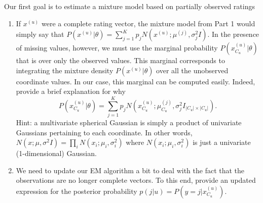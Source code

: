 \begin{enumerate}
Our first goal is to estimate a mixture model based on partially observed ratings 
\begin{enumerate}
\item If $x^{(u)}$ were a complete rating vector, the mixture model from Part 1 would simply say that $P(x^{(u)} | \theta) = \sum^{K}_{j=1} p_j N(x^{(u)}; \mu^{(j)}, \sigma^2_j I)$. In the presence of missing values, however, we must use the marginal probability $P(x^{(u)}_{C_u} | \theta)$ that is over only the observed values. This marginal corresponds to integrating the mixture density $P(x^{(u)} | \theta)$ over all the unobserved coordinate values. In our case, this marginal can be computed easily. Indeed, provide a brief explanation for why 
$$P(x^{(u)}_{C_u}  | \theta) = \sum^{K}_{j=1} p_j N(x^{(u)}_{C_u} ; \mu^{(j)}_{C_u} , \sigma^2_j I_{|C_u| \times |C_u|}).$$
Hint: a multivariate spherical Gaussian is simply a product of univariate Gaussians pertaining to each coordinate. In other words, $N(x;\mu,\sigma^2 I) = \prod_i N(x_i;\mu_i,\sigma_i^2)$ where $N(x_i;\mu_i,\sigma_i^2)$ is just a univariate (1-dimensional) Gaussian.

 \item We need to update our EM algorithm a bit to deal with the fact that the observations are no longer complete vectors. To this end, provide an updated expression for the posterior probability $p(j|u) = P(y=j|x^{(u)}_{C_u})$. 
 

\end{enumerate}
\end{enumerate}
